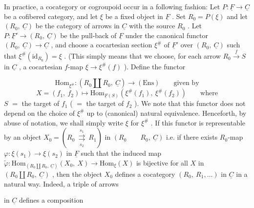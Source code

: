 In practice, a cocategory or cogroupoid occur in a following fashion: Let $P : \underline{F} \to \underline{C}$ be a cofibered category, and let $\xi$ be a fixed object in $\underline{F}$ . Set $R_0 = P(\xi)$ and let $(R_0,\ \underline{C})$ be the category of arrows in $\underline{C}$ with the source $R_0$ . Let $P : \underline{F}' \to (R_0,\ \underline{C})$ be the pull-back of $\underline{F}$ under the canonical functor $(R_0,\ \underline{C}) \to \underline{C}$ , and choose a cocartesian section $\xi^{\#}$ of $\underline{F}'$ over $(R_0,\ \underline{C})$ such that $\xi^{\#}(\mathrm{id}_{R_0}) = \xi$ . (This simply means that we choose, for each arrow $R_0 \xrightarrow{f} S$ in $\underline{C}$ , a cocartesian $f$-map $\xi \to \xi^{\#}(f)$ ). Define the functor

\begin{equation*}
\mathrm{Hom}_{\xi^{\#}} : (R_0 \amalg R_0,\ \underline{C}) \to (\mathrm{Ens}) \qquad \text{given by}
\end{equation*}
\begin{equation*}
X = (f_1,\ f_2) \longmapsto \mathrm{Hom}_{\underline{F}(S)}(\xi^{\#}(f_1),\ \xi^{\#}(f_2)) \qquad \text{where}
\end{equation*}
$S$ $=$ the target of $f_1$ ( $=$ the target of $f_2$ ). We note that this functor does not depend on the choice of $\xi^{\#}$ up to (canonical) natural equivalence. Henceforth, by abuse of notation, we shall simply write $\xi$ for $\xi^{\#}$ . If this functor is representable by an object $X_0 = (R_0 \ \overset{s_1}{\underset{s_2}{\rightrightarrows}}\ R_1)$ in $(R_0 \qquad R_0,\ \underline{C})$ i.e. if there exists $R_0$-map $\varphi : \xi(s_1) \to \xi(s_2)$ in $\underline{F}$ such that the induced map $\widetilde{\varphi} : \mathrm{Hom}_{(R_0 \amalg R_0,\ \underline{C})}(X_0,\ X) \to \mathrm{Hom}_{\xi}(X)$ is bijective for all $X$ in $(R_0 \amalg R_0,\ \underline{C})$ , then the object $X_0$ defines a cocategory $(R_0,\ R_1,\ldots)$ in $\underline{C}$ in a natural way. Indeed, a triple of arrows
in $\underline{C}$ defines a composition

